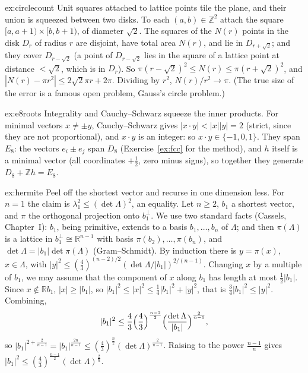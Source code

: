 \begin{solution}{ex:circlecount}
\idea Unit squares attached to lattice points tile the plane, and their union is squeezed between two disks.
\writeup To each $(a,b)\in\mathbb Z^2$ attach the square $[a,a+1)\times[b,b+1)$, of diameter $\sqrt2$. The squares of the $N(r)$ points in the disk $D_r$ of radius $r$ are
disjoint, have total area $N(r)$, and lie in $D_{r+\sqrt2}$; and they cover $D_{r-\sqrt2}$ (a point of $D_{r-\sqrt2}$ lies in the square of a lattice point at distance
$<\sqrt2$, which is in $D_r$). So $\pi(r-\sqrt2)^2\le N(r)\le\pi(r+\sqrt2)^2$, and $|N(r)-\pi r^2|\le2\sqrt2\pi r+2\pi$. Dividing by $r^2$, $N(r)/r^2\to\pi$. (The true size of the error is a famous open
problem, Gauss's circle problem.)
\end{solution}

\begin{solution}{ex:e8roots}
\idea Integrality and Cauchy--Schwarz squeeze the inner products.
\writeup For minimal vectors $x\ne\pm y$, Cauchy--Schwarz gives $|x\cdot y|<|x||y|=2$ (strict, since they are not proportional), and $x\cdot y$ is an integer: so
$x\cdot y\in\{-1,0,1\}$. They span $E_8$: the vectors $e_i\pm e_j$ span $D_8$ (Exercise~\ref{ex:fcc} for the method), and $h$ itself is a minimal vector (all
coordinates $+\frac12$, zero minus signs), so together they generate $D_8+\mathbb Zh=E_8$.
\end{solution}

\begin{solution}{ex:hermite}
\idea Peel off the shortest vector and recurse in one dimension less.
\writeup For $n=1$ the claim is $\lambda_1^2\le(\det\Lambda)^2$, an equality. Let $n\ge2$, $b_1$ a shortest vector, and $\pi$ the orthogonal projection onto
$b_1^\perp$. We use two standard facts (Cassels, Chapter~I): $b_1$, being primitive, extends to a basis $b_1,\dots,b_n$ of $\Lambda$; and then
$\pi(\Lambda)$ is a lattice in $b_1^\perp\cong\mathbb R^{n-1}$ with basis $\pi(b_2),\dots,\pi(b_n)$, and $\det\Lambda=|b_1|\det\pi(\Lambda)$
(Gram--Schmidt). By induction there is $y=\pi(x)$, $x\in\Lambda$, with
$|y|^2\le(\frac43)^{(n-2)/2}(\det\Lambda/|b_1|)^{2/(n-1)}$. Changing $x$ by a multiple of $b_1$, we may assume that the component of $x$ along $b_1$ has length at most
$\frac12|b_1|$. Since $x\notin\mathbb Rb_1$, $|x|\ge|b_1|$, so $|b_1|^2\le|x|^2\le\frac14|b_1|^2+|y|^2$, that is $\frac34|b_1|^2\le|y|^2$. Combining,
\[
|b_1|^2\le\frac43\Bigl(\frac43\Bigr)^{\frac{n-2}2}\Bigl(\frac{\det\Lambda}{|b_1|}\Bigr)^{\frac2{n-1}},
\]
so $|b_1|^{2+\frac2{n-1}}=|b_1|^{\frac{2n}{n-1}}\le(\frac43)^{\frac n2}(\det\Lambda)^{\frac2{n-1}}$. Raising to the power $\frac{n-1}n$ gives
$|b_1|^2\le(\frac43)^{\frac{n-1}2}(\det\Lambda)^{\frac2n}$.
\end{solution}

